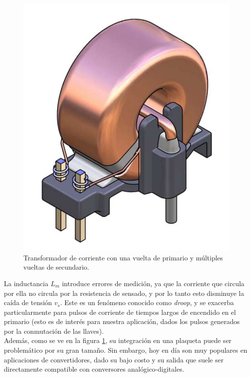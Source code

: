 \begin{figure}[h]
    \centering
    \includegraphics[scale=0.2]{Imagenes/Trafo Corriente.png}
    \caption{Transformador de corriente con una vuelta de primario y múltiples vueltas de secundario.}
    \label{trafo_corriente}
\end{figure}

La inductancia $L_m$ introduce errores de medición, ya que la corriente que circula por ella no circula por la resistencia de sensado, y por lo tanto esto disminuye la caída de tensión $v_s$. Este es un fenómeno conocido como \textit{droop}, y se exacerba particularmente para pulsos de corriente de tiempos largos de encendido en el primario (esto es de interés para nuestra aplicación, dados los pulsos generados por la conmutación de las llaves).\\

Además, como se ve en la figura \ref{trafo_corriente}, su integración en una plaqueta puede ser problemático por su {\Medium gran tamaño}. Sin embargo, hoy en día son muy populares en aplicaciones de convertidores, dado su {\Medium bajo costo} y su salida que suele ser directamente compatible con conversores analógico-digitales.\\

